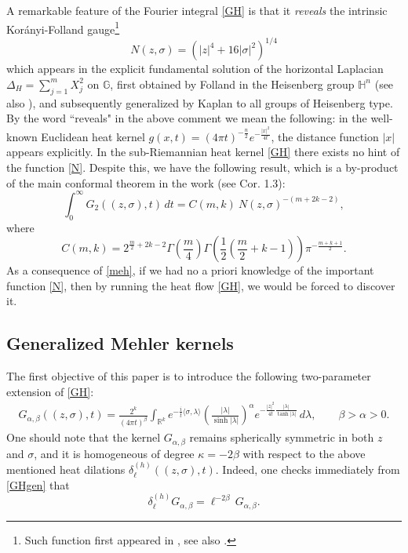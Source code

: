 \documentclass[11pt,a4paper]{amsart}
\def \R {\mathbb{R}}
\newcommand{\Hn}{\mathbb H^n}
\newcommand{\bG}{\mathbb {G}}
\numberwithin{equation}{section}
\numberwithin{equation}{section}
\begin{document}
A remarkable feature of the Fourier integral \eqref{GH} is that it \emph{reveals} the intrinsic Kor\'anyi-Folland gauge\footnote{Such function first appeared in \cite{KV}, see also \cite{Adam85, KoR}.}
\begin{equation}\label{N}
N(z,\sigma) = (|z|^4 + 16|\sigma|^2)^{1/4}
\end{equation}
which appears in the explicit fundamental solution of the horizontal Laplacian $\Delta_H = \sum_{j=1}^m X_j^2$ on $\bG$, first obtained by Folland \cite{Fo} in the Heisenberg group $\Hn$ (see also \cite{FScpam}), and subsequently generalized by Kaplan \cite{Ka} to all groups of Heisenberg type. By the word ``reveals" in the above comment we mean the following: in the well-known Euclidean heat kernel $g(x,t) = (4\pi t)^{-\frac n2} e^{-\frac{|x|^2}{4t}}$, the distance function $|x|$ appears explicitly. In the sub-Riemannian heat kernel \eqref{GH} there exists no hint of the function \eqref{N}. Despite this, we have the following result, which is a by-product of the main conformal theorem in the work \cite{GTaim} (see Cor. 1.3):
\begin{equation}\label{meh}
\int_0^\infty G_2((z,\sigma),t)\, dt
= C(m,k)\ N(z,\sigma)^{-(m+2k-2)},
\end{equation}
where
\[ 
C(m,k) = 2^{\frac m2+2k-2} \Gamma(\frac m4) \Gamma(\frac12(\frac m2 + k -1)) \pi^{-\frac{m+k+1}{2}}.
\]
As a consequence of \eqref{meh}, if we had no a priori knowledge of the important function \eqref{N}, then by running the heat flow \eqref{GH}, we would be forced to discover it.


\subsection{Generalized Mehler kernels}
The first objective of this paper is to introduce the following two-parameter extension of \eqref{GH}:
\begin{align}\label{GHgen}
G_{\alpha,\beta}((z,\sigma),t)
 = \frac{2^k}{(4\pi t)^{\beta}}
   \int_{\R^k} e^{-\frac{i}{t}\langle\sigma,\lambda\rangle}
   \left(\frac{|\lambda|}{\sinh |\lambda|}\right)^{\alpha}
   e^{- \frac{|z|^2}{4t}\frac{|\lambda|}{\tanh |\lambda|}}
   \, d\lambda,
   \qquad \beta>\alpha>0.
\end{align}
One should note that the kernel $G_{\alpha,\beta}$ remains spherically symmetric in both $z$ and $\sigma$, and it is homogeneous of degree $\kappa = - 2\beta$ with respect to the above mentioned heat dilations $\delta^{(h)}_\ell((z,\sigma),t)$. Indeed,  one checks immediately from \eqref{GHgen} that
\[
\delta^{(h)}_\ell G_{\alpha,\beta} = \ell^{-2\beta}\, G_{\alpha,\beta}.
\]
\end{document}
